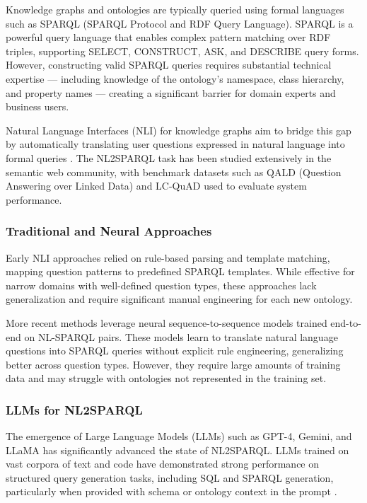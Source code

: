 \documentclass[a4paper,11pt,oneside]{article}
\begin{document}
Knowledge graphs and ontologies are typically queried using formal languages such as SPARQL (SPARQL Protocol and RDF Query Language). SPARQL is a powerful query language that enables complex pattern matching over RDF triples, supporting SELECT, CONSTRUCT, ASK, and DESCRIBE query forms. However, constructing valid SPARQL queries requires substantial technical expertise — including knowledge of the ontology's namespace, class hierarchy, and property names — creating a significant barrier for domain experts and business users.

Natural Language Interfaces (NLI) for knowledge graphs aim to bridge this gap by automatically translating user questions expressed in natural language into formal queries \cite{hoffner2017}. The NL2SPARQL task has been studied extensively in the semantic web community, with benchmark datasets such as QALD (Question Answering over Linked Data) and LC-QuAD used to evaluate system performance.

\subsubsection{Traditional and Neural Approaches}

Early NLI approaches relied on rule-based parsing and template matching, mapping question patterns to predefined SPARQL templates. While effective for narrow domains with well-defined question types, these approaches lack generalization and require significant manual engineering for each new ontology.

More recent methods leverage neural sequence-to-sequence models trained end-to-end on NL-SPARQL pairs. These models learn to translate natural language questions into SPARQL queries without explicit rule engineering, generalizing better across question types. However, they require large amounts of training data and may struggle with ontologies not represented in the training set.

\subsubsection{LLMs for NL2SPARQL}

The emergence of Large Language Models (LLMs) such as GPT-4, Gemini, and LLaMA has significantly advanced the state of NL2SPARQL. LLMs trained on vast corpora of text and code have demonstrated strong performance on structured query generation tasks, including SQL and SPARQL generation, particularly when provided with schema or ontology context in the prompt \cite{omar2023}.
\end{document}
